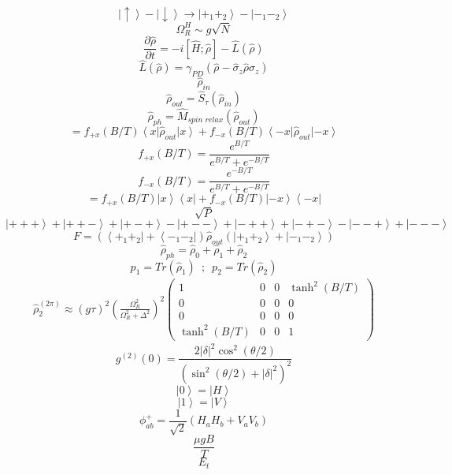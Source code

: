 \documentclass[12pt]{article}
\begin{document}
\begin{large}
\[\]
\[
    \left| \uparrow \right> - \left| \downarrow \right> \rightarrow \left| +_1 +_2 \right> - \left| -_1 -_2 \right>
\]
\[
    \Omega^H_R \sim g \sqrt{N}
\]
\[
     \frac{\partial \hat{\rho} }{\partial t} = -i \left[ \hat{H} ; \hat{\rho} \right] - \hat{L}(\hat{\rho})
\]
\[
    \hat{L}(\hat{\rho}) = \gamma_{PD} \left( \hat{\rho} - \hat{\sigma}_z \hat{\rho} \hat{\sigma}_z \right)
\]
\[
    \hat{\rho}_{in}
\]
\[
    \hat{\rho}_{out} = \hat{S}_{\tau} \left( \hat{\rho}_{in} \right)
\]
\[
    \hat{\rho}_{ph} = \hat{M}_{spin \,\, relax} \left(  \hat{\rho}_{out}  \right)
\]
\[
    = f_{+x}\left( B/T \right) \left< x \right| \hat{\rho}_{out} \left| x \right> + f_{-x}\left( B/T \right) \left< -x \right| \hat{\rho}_{out} \left| -x \right>
\]
\[
    f_{+x}\left( B/T \right) = \frac{e^{B/T}}{e^{B/T} + e^{-B/T}}
\]
\[
    f_{-x}\left( B/T \right) = \frac{e^{-B/T}}{e^{B/T} + e^{-B/T}}
\]
\[
    = f_{+x}\left( B/T \right) \left| x \right> \left< x \right|  + f_{-x}\left( B/T \right)  \left| -x \right> \left< -x \right|
\]
\[
    \sqrt{P}
\]
\[
    \left| +++ \right> + \left| ++- \right> + \left| +-+ \right> - \left| +-- \right> + \left| -++ \right> + \left| -+- \right> - \left| --+ \right> + \left| --- \right>
\]
\[
    F =\left( \left< +_1 +_2 \right| + \left< -_1 -_2 \right| \right) \hat{\rho}_{out}  \left( \left| +_1 +_2 \right> + \left| -_1 -_2 \right> \right)
\]
\[
    \hat{\rho}_{ph} = \hat{\rho}_{0} + \hat{\rho}_{1} + \hat{\rho}_{2}
\]
\[
    p_1 = Tr\left( \hat{\rho}_{1} \right) \, \, \, ; \, \, \, p_2 = Tr\left( \hat{\rho}_{2} \right)
\]
\begin{gather*}
    \hat{\rho}^{(2\pi)}_2 \approx \left( g \tau \right)^2 \left( \frac{ \Omega_R^2}{ \Omega_R^2 + \Delta^2} \right)^2
\begin{pmatrix}
    1 & 0 & 0 & \tanh^2\left( B/T \right) \\
    0 & 0 & 0 & 0 \\
    0 & 0 & 0 & 0 \\
    \tanh^2\left( B/T \right) & 0 & 0 & 1
\end{pmatrix}
\end{gather*}
\[
    g^{(2)}(0) = \frac{2\left| \delta \right|^2 \cos^2(\theta/2)}{\left( \sin^2(\theta/2) + \left| \delta \right|^2 \right)^2}
\]
\[
    \left| 0 \right> = \left| H \right>
\]
\[
    \left| 1 \right> = \left| V \right>
\]
\[
    \phi_{ab}^+ = \frac{1}{\sqrt{2}} \left(  H_a H_b +  V_a V_b \right)
\]
\[
    \frac{\mu g B}{T}
\]
\[
    E_t
\]
\[

\]
\par
\end{large}
\end{document}
